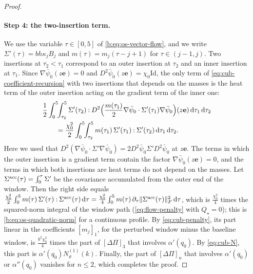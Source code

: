 \begin{proof}
\paragraph{Step 4: the two-insertion term.} We use the variable
$\tau\in[0,5]$ of \eqref{b:eq:os-vector-flow}, and we write
$\Sigma'(\tau)=bh\kappa_jB_j$ and $m(\tau)=m_j(\tau-j+1)$ for $\tau\in(j-1,j)$.
Two insertions at $\tau_2<\tau_1$ correspond to an outer insertion at $\tau_2$
and an inner insertion at $\tau_1$. Since $\nabla\bar\psi_0(z\mathbf e)=0$ and
$D^2\bar\psi_0(z\mathbf e)=\chi_0\mathrm{Id}$, the only term of
\eqref{eq:cub-coefficient-recursion} with two insertions that depends on the
masses is the heat term of the outer insertion acting on the gradient term of the
inner one:
\[
\begin{aligned}
 &\frac12\int_0^5\!\!\int_{\tau_2}^5\Sigma'(\tau_2)\mathbin:D^2\Bigl(\frac{m(\tau_1)}2
 \nabla\bar\psi_0\cdot\Sigma'(\tau_1)\nabla\bar\psi_0\Bigr)(z\mathbf e)\,\mathrm d\tau_1\,\mathrm d\tau_2\\
 &\qquad=\frac{\chi_0^2}2\int_0^5\!\!\int_{\tau_2}^5m(\tau_1)\,\Sigma'(\tau_1)\mathbin:\Sigma'(\tau_2)
 \,\mathrm d\tau_1\,\mathrm d\tau_2 .
\end{aligned}
\]
Here we used that $D^2(\nabla\bar\psi_0\cdot\Sigma'\nabla\bar\psi_0)=2D^2\bar\psi_0\Sigma'D^2\bar\psi_0$ at
$z\mathbf e$. The terms in which the outer insertion is a gradient term
contain the factor $\nabla\bar\psi_0(z\mathbf e)=0$, and the terms in which both
insertions are heat terms do not depend on the masses. Let
$\Sigma^{\rm acc}(\tau)=\int_0^\tau\Sigma'$ be the covariance accumulated from
the outer end of the window. Then the right side equals
$\frac{\chi_0^2}2\int_0^5m(\tau)\,\Sigma'(\tau)\mathbin:\Sigma^{\rm acc}(\tau)\,\mathrm d\tau
=\frac{\chi_0^2}4\int_0^5m(\tau)\,\partial_\tau\lVert \Sigma^{\rm acc}(\tau)\rVert_F^2\,\mathrm d\tau$,
which is $\frac{\chi_0^2}4$ times the squared-norm integral of the window path
(\eqref{eq:flow-penalty} with $Q_\star=0$); this is
\eqref{b:eq:os-quadratic-norm} for a continuous profile. By
\eqref{eq:cub-penalty}, its part linear in the coefficients $[m_j]_1$, for the
perturbed window minus the baseline window, is $\frac{b^2\chi_0^2}4$ times the
part of $[\Delta\Pi]_3$ that involves $\alpha'(q_0)$. By \eqref{eq:cub-N}, this
part is $\alpha'(q_0)N^{(1)}_\vartheta(k)$. Finally, the part of
$[\Delta\Pi]_n$ that involves $\alpha'(q_0)$ or $\alpha''(q_0)$ vanishes for
$n\le2$, which completes the proof.
\end{proof}


